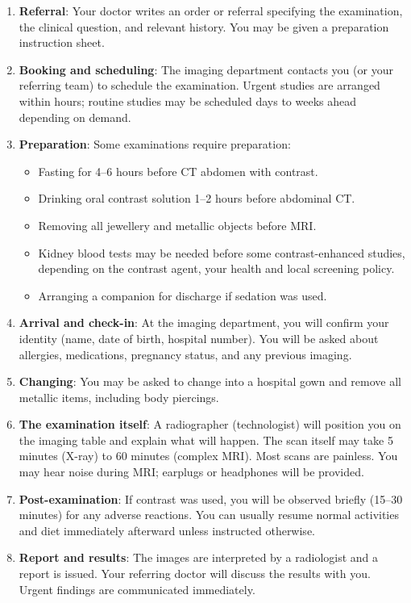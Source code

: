 \begin{enumerate}
    \item \textbf{Referral}: Your doctor writes an order or referral specifying the examination, the clinical question, and relevant history. You may be given a preparation instruction sheet.
    \item \textbf{Booking and scheduling}: The imaging department contacts you (or your referring team) to schedule the examination. Urgent studies are arranged within hours; routine studies may be scheduled days to weeks ahead depending on demand.
    \item \textbf{Preparation}: Some examinations require preparation:
    \begin{itemize}
        \item Fasting for 4--6 hours before CT abdomen with contrast.
        \item Drinking oral contrast solution 1--2 hours before abdominal CT.
        \item Removing all jewellery and metallic objects before MRI.
        \item Kidney blood tests may be needed before some contrast-enhanced studies, depending on the contrast agent, your health and local screening policy.
        \item Arranging a companion for discharge if sedation was used.
    \end{itemize}
    \item \textbf{Arrival and check-in}: At the imaging department, you will confirm your identity (name, date of birth, hospital number). You will be asked about allergies, medications, pregnancy status, and any previous imaging.
    \item \textbf{Changing}: You may be asked to change into a hospital gown and remove all metallic items, including body piercings.
    \item \textbf{The examination itself}: A radiographer (technologist) will position you on the imaging table and explain what will happen. The scan itself may take 5 minutes (X-ray) to 60 minutes (complex MRI). Most scans are painless. You may hear noise during MRI; earplugs or headphones will be provided.
    \item \textbf{Post-examination}: If contrast was used, you will be observed briefly (15--30 minutes) for any adverse reactions. You can usually resume normal activities and diet immediately afterward unless instructed otherwise.
    \item \textbf{Report and results}: The images are interpreted by a radiologist and a report is issued. Your referring doctor will discuss the results with you. Urgent findings are communicated immediately.
\end{enumerate}

